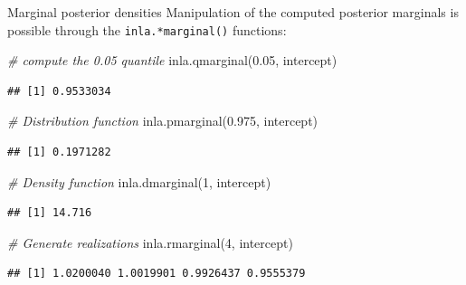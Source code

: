 \documentclass[
  handout]{beamer}
\newenvironment{Shaded}{\begin{snugshade}}{\end{snugshade}}
\newcommand{\CommentTok}[1]{\textcolor[rgb]{0.56,0.35,0.01}{\textit{#1}}}
\newcommand{\DecValTok}[1]{\textcolor[rgb]{0.00,0.00,0.81}{#1}}
\newcommand{\FloatTok}[1]{\textcolor[rgb]{0.00,0.00,0.81}{#1}}
\newcommand{\FunctionTok}[1]{\textcolor[rgb]{0.00,0.00,0.00}{#1}}
\newcommand{\NormalTok}[1]{#1}
\begin{document}
\begin{frame}[fragile]{Marginal posterior densities}
\protect\hypertarget{marginal-posterior-densities-2}{}
Manipulation of the computed posterior marginals is possible through the
\texttt{inla.*marginal()} functions:

\small

\begin{Shaded}
\begin{Highlighting}[]
\CommentTok{\# compute the 0.05 quantile}
\FunctionTok{inla.qmarginal}\NormalTok{(}\FloatTok{0.05}\NormalTok{, intercept)}
\end{Highlighting}
\end{Shaded}

\begin{verbatim}
## [1] 0.9533034
\end{verbatim}

\begin{Shaded}
\begin{Highlighting}[]
\CommentTok{\# Distribution function}
\FunctionTok{inla.pmarginal}\NormalTok{(}\FloatTok{0.975}\NormalTok{, intercept)}
\end{Highlighting}
\end{Shaded}

\begin{verbatim}
## [1] 0.1971282
\end{verbatim}

\begin{Shaded}
\begin{Highlighting}[]
\CommentTok{\# Density function}
\FunctionTok{inla.dmarginal}\NormalTok{(}\DecValTok{1}\NormalTok{, intercept)}
\end{Highlighting}
\end{Shaded}

\begin{verbatim}
## [1] 14.716
\end{verbatim}

\begin{Shaded}
\begin{Highlighting}[]
\CommentTok{\# Generate realizations}
\FunctionTok{inla.rmarginal}\NormalTok{(}\DecValTok{4}\NormalTok{, intercept)}
\end{Highlighting}
\end{Shaded}

\begin{verbatim}
## [1] 1.0200040 1.0019901 0.9926437 0.9555379
\end{verbatim}

\normalsize
\end{frame}
\end{document}
